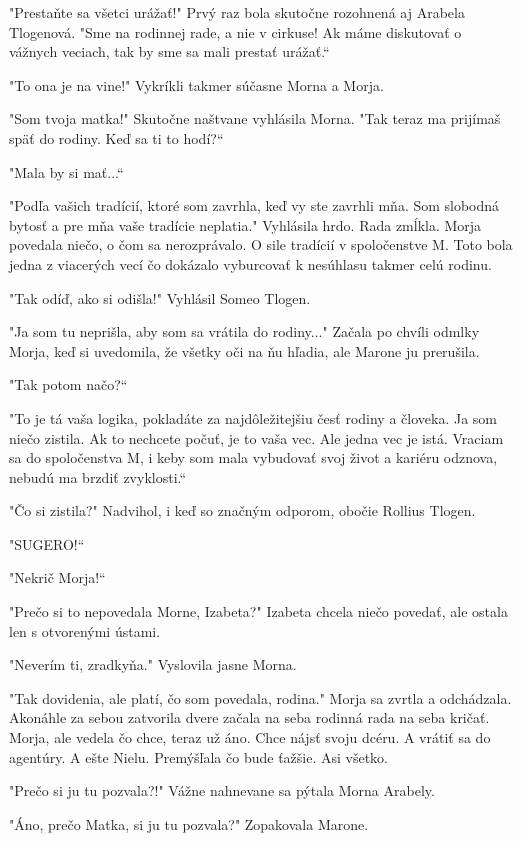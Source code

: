 \documentclass{book}
\begin{document}
"$ $Prestaňte sa všetci urážať!"$ $ Prvý raz bola skutočne rozohnená aj Arabela Tlogenová. "$ $Sme na rodinnej rade, a nie v cirkuse! Ak máme diskutovať o vážnych veciach, tak by sme sa mali prestať urážať.“

"$ $To ona je na vine!"$ $ Vykríkli takmer súčasne Morna a Morja.

"$ $Som tvoja matka!"$ $ Skutočne naštvane vyhlásila Morna. "$ $Tak teraz ma prijímaš späť do rodiny. Keď sa ti to hodí?“

"$ $Mala by si mať...“

"$ $Podľa vašich tradícií, ktoré som zavrhla, keď vy ste zavrhli mňa. Som slobodná bytosť a pre mňa vaše tradície neplatia."$ $ Vyhlásila hrdo. Rada zmĺkla. Morja povedala niečo, o čom sa nerozprávalo. O sile tradícií v spoločenstve M. Toto bola jedna z viacerých vecí čo dokázalo vyburcovať k nesúhlasu takmer celú rodinu.

"$ $Tak odíď, ako si odišla!"$ $ Vyhlásil Someo Tlogen.

"$ $Ja som tu neprišla, aby som sa vrátila do rodiny..."$ $ Začala po chvíli odmlky Morja, keď si uvedomila, že všetky oči na ňu hľadia, ale Marone ju prerušila.

"$ $Tak potom načo?“

"$ $To je tá vaša logika, pokladáte za najdôležitejšiu česť rodiny a človeka. Ja som niečo zistila. Ak to nechcete počuť, je to vaša vec. Ale jedna vec je istá. Vraciam sa do spoločenstva M, i keby som mala vybudovať svoj život a kariéru odznova, nebudú ma brzdiť zvyklosti.“

"$ $Čo si zistila?"$ $ Nadvihol, i keď so značným odporom, obočie Rollius Tlogen.

"$ $SUGERO!“

"$ $Nekrič Morja!“

"$ $Prečo si to nepovedala Morne, Izabeta?"$ $ Izabeta chcela niečo povedať, ale ostala len s otvorenými ústami.

"$ $Neverím ti, zradkyňa."$ $ Vyslovila jasne Morna.

"$ $Tak dovidenia, ale platí, čo som povedala, rodina."$ $ Morja sa zvrtla a odchádzala. Akonáhle za sebou zatvorila dvere začala na seba rodinná rada na seba kričať. Morja, ale vedela čo chce, teraz už áno. Chce nájsť svoju dcéru. A vrátiť sa do agentúry. A ešte Nielu. Premýšľala čo bude ťažšie. Asi všetko.

"$ $Prečo si ju tu pozvala?!"$ $ Vážne nahnevane sa pýtala Morna Arabely.

"$ $Áno, prečo Matka, si ju tu pozvala?"$ $ Zopakovala Marone.
\end{document}
